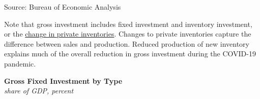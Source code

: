 \documentclass{report}
\makeatletter
\newcommand{\tbllink}[1]{\href{https://raw.githubusercontent.com/bdecon/US-chartbook/master/chartbook/data/#1}{\faTable}}
\newcommand*\short[1]{\expandafter\@gobbletwo\number\numexpr#1\relax}
\newcommand{\absnode}[3]{\node[below right, align=left] at (axis cs: #1,#2) {#3};}
\newcommand{\shdateaxisticks}{
		date coordinates in=x, axis line style={draw=none},
		xmax={2024-01-31},
		max space between ticks=40,	    
		xtick={{1990-01-01}, {1995-01-01}, {2000-01-01}, 
			{2005-01-01}, {2010-01-01}, {2015-01-01}, {2020-01-01}},
		minor xtick={},
		enlarge y limits={0.06}, enlarge x limits={0.01},
		xticklabel style={align=center, yshift=-2pt}, tick label style={inner sep=0pt},
		}
\newcommand{\bbar}[2]{extra #1 ticks = {{#2}}, extra #1 tick labels = ,
		extra #1 tick style = {grid=major, grid style={thick, black!25}},}
\newcommand{\stdline}[4]{\addplot[very thick, no markers, color=#1] 
		table [x=#2, y=#3, col sep=comma] {#4};	}
\newcommand{\rbars}{
		\fill[color=black!10] (axis cs:{1990-07-01},\pgfkeysvalueof{/pgfplots/ymin})
			rectangle (axis cs:{1991-03-01}, \pgfkeysvalueof{/pgfplots/ymax});
		\fill[color=black!10] (axis cs:{2007-12-01},\pgfkeysvalueof{/pgfplots/ymin})
			rectangle (axis cs:{2009-07-01}, \pgfkeysvalueof{/pgfplots/ymax});
		\fill[color=black!10] (axis cs:{2001-03-01},\pgfkeysvalueof{/pgfplots/ymin})
			rectangle (axis cs:{2001-11-01}, \pgfkeysvalueof{/pgfplots/ymax});
		\fill[color=black!10] (axis cs:{2020-02-01},\pgfkeysvalueof{/pgfplots/ymin})
			rectangle (axis cs:{2020-05-01}, \pgfkeysvalueof{/pgfplots/ymax});}
\makeatother
\begin{document}
{\begin{minipage}{0.355\textwidth}
\footnotesize{Source: Bureau of Economic Analysis} \hfill \tbllink{businv_main.csv}
\end{minipage} \hspace{4.5mm}
\begin{minipage}{0.365\textwidth}
\small 
\end{minipage}


\begin{minipage}{1.0\textwidth}   
\small Note that gross investment includes fixed investment and inventory investment, or the \href{https://www.bea.gov/help/glossary/change-private-inventories-cipi}{change in private inventories}. Changes to private inventories capture the difference between sales and production. Reduced production of new inventory explains much of the overall reduction in gross investment during the COVID-19 pandemic. 
\end{minipage}
\newpage
\vspace*{-9mm}

\begin{minipage}{0.295\textwidth}
\small 
\end{minipage} \hspace{5mm}
\begin{minipage}{0.425\textwidth}
\normalsize \textbf{Gross Fixed Investment by Type}\\
\footnotesize{\textit{share of GDP, percent}}
\vspace{2.7cm}

\hspace{1mm} 


\end{minipage}}
\end{document}
